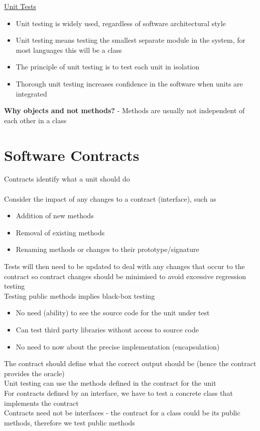 \documentclass{article}[18pt]
\begin{document}
\begin{center}
\underline{\huge Unit Tests}
\end{center}
\begin{itemize}
	\item Unit testing is widely used, regardless of software architectural style
	\item Unit testing means testing the smallest separate module in the system, for most languages this will be a class
	\item The principle of unit testing is to test each unit in isolation
	\item Thorough unit testing increases confidence in the software when units are integrated
\end{itemize}
\textbf{Why objects and not methods?} - Methods are usually not independent of each other in a class
\section{Software Contracts}
Contracts identify what a unit should do\\
\\
Consider the impact of any changes to a contract (interface), such as
\begin{itemize}
	\item Addition of new methods
	\item Removal of existing methods
	\item Renaming methods or changes to their prototype/signature
\end{itemize}
Tests will then need to be updated to deal with any changes that occur to the contract so contract changes should be minimised to avoid excessive regression testing\\
Testing public methods implies black-box testing
\begin{itemize}
	\item No need (ability) to see the source code for the unit under test
	\item Can test third party libraries without access to source code
	\item No need to now about the precise implementation (encapsulation)
\end{itemize}
The contract should define what the correct output should be (hence the contract provides the oracle)\\
Unit testing can use the methods defined in the contract for the unit\\
For contracts defined by an interface, we have to test a concrete class that implements the contract\\
Contracts need not be interfaces - the contract for a class could be its public methods, therefore we test public methods
\end{document}
